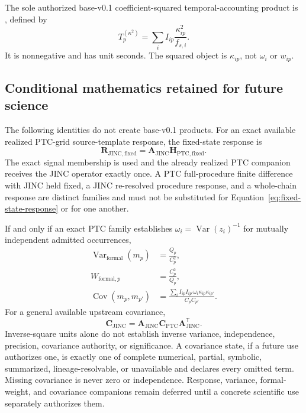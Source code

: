 The sole authorized base-v0.1 coefficient-squared temporal-accounting product
is , defined by
\begin{equation}
  T_p^{(\kappa^2)}
  =\sum_i I_{ip}\frac{\kappa_{ip}^{2}}{f_{s,i}}.
  \label{eq:kappa-time}
\end{equation}
It is nonnegative and has unit seconds.  The squared object is $\kappa_{ip}$,
not $\omega_i$ or $w_{ip}$.

\subsection{Conditional mathematics retained for future science}
\label{sec:conditional-math}

The following identities do not create base-v0.1 products.  For an exact
available realized PTC-grid source-template response, the fixed-state response
is
\begin{equation}
  \mathbf{R}_{\mathrm{JINC,fixed}}
  =\mathbf{A}_{\mathrm{JINC}}
   \mathbf{H}_{\mathrm{PTC,fixed}}.
  \label{eq:fixed-state-response}
\end{equation}
The exact signal membership is used and the already realized PTC companion
receives the JINC operator exactly once.  A PTC full-procedure finite
difference with JINC held fixed, a JINC re-resolved procedure response, and a
whole-chain response are distinct families and must not be substituted for
Equation~\eqref{eq:fixed-state-response} or for one another.

If and only if an
exact PTC family establishes $\omega_i=\operatorname{Var}(z_i)^{-1}$ for
mutually independent admitted occurrences,
\begin{align}
  \operatorname{Var}_{\mathrm{formal}}(m_p) &= \frac{Q_p}{C_p^2},
    \label{eq:conditional-variance}\\
  W_{\mathrm{formal},p} &= \frac{C_p^2}{Q_p},
    \label{eq:conditional-weight}\\
  \operatorname{Cov}(m_p,m_{p'})
   &=\frac{\sum_i I_{ip}I_{ip'}\omega_i\kappa_{ip}\kappa_{ip'}}
           {C_pC_{p'}}.
    \label{eq:conditional-covariance}
\end{align}
For a general available upstream covariance,
\begin{equation}
  \mathbf{C}_{\mathrm{JINC}}
  =\mathbf{A}_{\mathrm{JINC}}
   \mathbf{C}_{\mathrm{PTC}}
   \mathbf{A}_{\mathrm{JINC}}^{\mathsf T}.
  \label{eq:general-covariance}
\end{equation}
Inverse-square units alone do not establish inverse variance, independence,
precision, covariance authority, or significance.  A covariance state, if a
future use authorizes one, is exactly one of complete numerical, partial,
symbolic, summarized, lineage-resolvable, or unavailable and declares every
omitted term.  Missing covariance is never zero or independence.  Response,
variance, formal-weight, and covariance companions remain deferred until a
concrete scientific use separately authorizes them.
